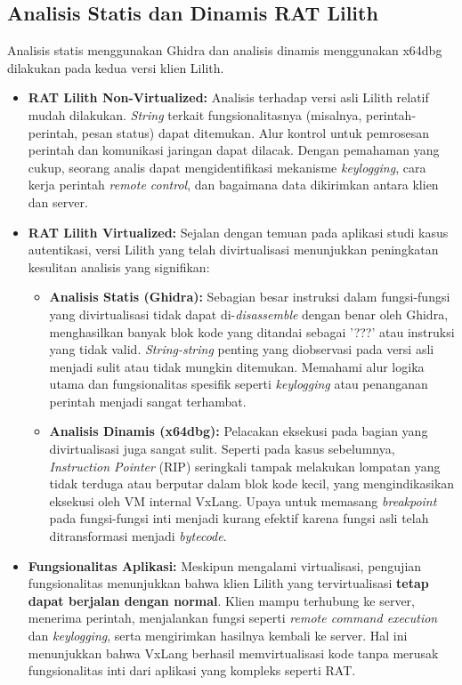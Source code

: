 \subsection{Analisis Statis dan Dinamis RAT Lilith}
\label{subsec:analisis_statdin_lilith} %
Analisis statis menggunakan Ghidra dan analisis dinamis menggunakan x64dbg dilakukan pada kedua versi klien Lilith.
\begin{itemize}
    \item \textbf{RAT Lilith Non-Virtualized:} Analisis terhadap versi asli Lilith relatif mudah dilakukan. \textit{String} terkait fungsionalitasnya (misalnya, perintah-perintah, pesan status) dapat ditemukan. Alur kontrol untuk pemrosesan perintah dan komunikasi jaringan dapat dilacak. Dengan pemahaman yang cukup, seorang analis dapat mengidentifikasi mekanisme \textit{keylogging}, cara kerja perintah \textit{remote control}, dan bagaimana data dikirimkan antara klien dan server.
    \item \textbf{RAT Lilith Virtualized:} Sejalan dengan temuan pada aplikasi studi kasus autentikasi, versi Lilith yang telah divirtualisasi menunjukkan peningkatan kesulitan analisis yang signifikan:
        \begin{itemize}
            \item \textbf{Analisis Statis (Ghidra):} Sebagian besar instruksi dalam fungsi-fungsi yang divirtualisasi tidak dapat di-\textit{disassemble} dengan benar oleh Ghidra, menghasilkan banyak blok kode yang ditandai sebagai '???' atau instruksi yang tidak valid. \textit{String-string} penting yang diobservasi pada versi asli menjadi sulit atau tidak mungkin ditemukan. Memahami alur logika utama dan fungsionalitas spesifik seperti \textit{keylogging} atau penanganan perintah menjadi sangat terhambat.
            \item \textbf{Analisis Dinamis (x64dbg):} Pelacakan eksekusi pada bagian yang divirtualisasi juga sangat sulit. Seperti pada kasus sebelumnya, \textit{Instruction Pointer} (RIP) seringkali tampak melakukan lompatan yang tidak terduga atau berputar dalam blok kode kecil, yang mengindikasikan eksekusi oleh VM internal VxLang. Upaya untuk memasang \textit{breakpoint} pada fungsi-fungsi inti menjadi kurang efektif karena fungsi asli telah ditransformasi menjadi \textit{bytecode}.
        \end{itemize}
    \item \textbf{Fungsionalitas Aplikasi:} Meskipun mengalami virtualisasi, pengujian fungsionalitas menunjukkan bahwa klien Lilith yang tervirtualisasi \textbf{tetap dapat berjalan dengan normal}. Klien mampu terhubung ke server, menerima perintah, menjalankan fungsi seperti \textit{remote command execution} dan \textit{keylogging}, serta mengirimkan hasilnya kembali ke server. Hal ini menunjukkan bahwa VxLang berhasil memvirtualisasi kode tanpa merusak fungsionalitas inti dari aplikasi yang kompleks seperti RAT.
\end{itemize}

